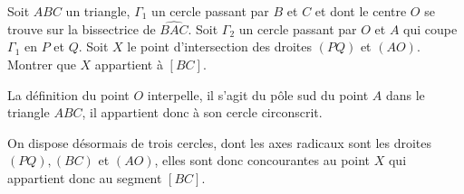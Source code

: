 \begin{exo}
Soit $ABC$ un triangle, $\Gamma_1$ un cercle passant par $B$ et $C$ et dont le centre $O$ se trouve sur la bissectrice de $\widehat{BAC}$. Soit $\Gamma_2$ un cercle passant par $O$ et $A$ qui coupe $\Gamma_1$ en $P$ et $Q$. Soit $X$ le point d'intersection des droites $(PQ)$ et $(AO)$. Montrer que $X$ appartient à $[BC]$. 
\end{exo}
\begin{sol}
\begin{center}
\end{center}

La définition du point $O$ interpelle, il s'agit du pôle sud du point $A$ dans le triangle $ABC$, il appartient donc à son cercle circonscrit.

On dispose désormais de trois cercles, dont les axes radicaux sont les droites $(PQ), (BC)$ et $(AO)$, elles sont donc concourantes au point $X$ qui appartient donc au segment $[BC]$.
\end{sol}


